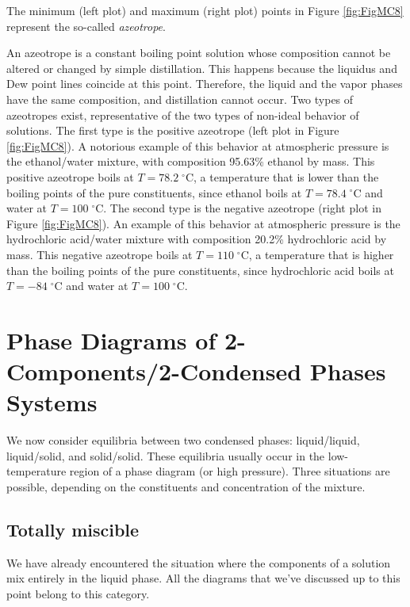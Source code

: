 \documentclass[
  9pt,
]{extbook}
\theoremstyle{definition}
\theoremstyle{definition}
\theoremstyle{definition}
\theoremstyle{remark}
\begin{document}
The minimum (left plot) and maximum (right plot) points in Figure \ref{fig:FigMC8} represent the so-called \emph{azeotrope}.

An azeotrope is a constant boiling point solution whose composition cannot be altered or changed by simple distillation. This happens because the liquidus and Dew point lines coincide at this point. Therefore, the liquid and the vapor phases have the same composition, and distillation cannot occur. Two types of azeotropes exist, representative of the two types of non-ideal behavior of solutions. The first type is the positive azeotrope (left plot in Figure \ref{fig:FigMC8}). A notorious example of this behavior at atmospheric pressure is the ethanol/water mixture, with composition 95.63\% ethanol by mass. This positive azeotrope boils at \(T=78.2\;^\circ \text{C}\), a temperature that is lower than the boiling points of the pure constituents, since ethanol boils at \(T=78.4\;^\circ \text{C}\) and water at \(T=100\;^\circ \text{C}\). The second type is the negative azeotrope (right plot in Figure \ref{fig:FigMC8}). An example of this behavior at atmospheric pressure is the hydrochloric acid/water mixture with composition 20.2\% hydrochloric acid by mass. This negative azeotrope boils at \(T=110\;^\circ \text{C}\), a temperature that is higher than the boiling points of the pure constituents, since hydrochloric acid boils at \(T=-84\;^\circ \text{C}\) and water at \(T=100\;^\circ \text{C}\).

\hypertarget{phase-diagrams-of-2-components2-condensed-phases-systems}{%
\section{Phase Diagrams of 2-Components/2-Condensed Phases Systems}\label{phase-diagrams-of-2-components2-condensed-phases-systems}}

We now consider equilibria between two condensed phases: liquid/liquid, liquid/solid, and solid/solid. These equilibria usually occur in the low-temperature region of a phase diagram (or high pressure). Three situations are possible, depending on the constituents and concentration of the mixture.

\hypertarget{totally-miscible}{%
\subsection{Totally miscible}\label{totally-miscible}}

We have already encountered the situation where the components of a solution mix entirely in the liquid phase. All the diagrams that we've discussed up to this point belong to this category.
\end{document}
